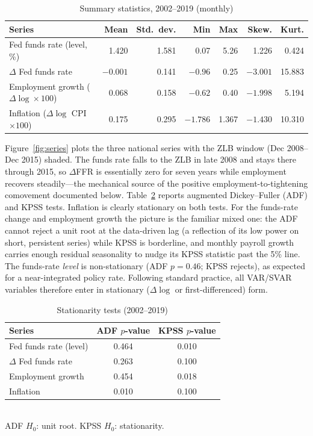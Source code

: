 \documentclass[11pt]{article}
\begin{document}
\begin{table}[H]\centering
\caption{Summary statistics, 2002--2019 (monthly)}\label{tab:summary}
\small
\begin{tabular}{lrrrrrr}
\toprule
Series & Mean & Std.\ dev. & Min & Max & Skew. & Kurt. \\
\midrule
Fed funds rate (level, \%) & 1.420 & 1.581 & 0.07 & 5.26 & 1.226 & 0.424 \\
$\Delta$ Fed funds rate & $-0.001$ & 0.141 & $-0.96$ & 0.25 & $-3.001$ & 15.883 \\
Employment growth ($\Delta\log\times100$) & 0.068 & 0.158 & $-0.62$ & 0.40 & $-1.998$ & 5.194 \\
Inflation ($\Delta\log$ CPI$\times100$) & 0.175 & 0.295 & $-1.786$ & 1.367 & $-1.430$ & 10.310 \\
\bottomrule
\end{tabular}
\end{table}

Figure~\ref{fig:series} plots the three
national series with the ZLB window (Dec 2008--Dec 2015) shaded. The funds rate falls to the
ZLB in late 2008 and stays there through 2015, so $\Delta$FFR is essentially zero for seven
years while employment recovers steadily---the mechanical source of the positive
employment-to-tightening comovement documented below. Table~\ref{tab:adfkpss} reports augmented
Dickey--Fuller (ADF) and KPSS tests. Inflation is clearly stationary on both tests. For the
funds-rate change and employment growth the picture is the familiar mixed one: the ADF cannot
reject a unit root at the data-driven lag (a reflection of its low power on short, persistent
series) while KPSS is borderline, and monthly payroll growth carries enough residual seasonality
to nudge its KPSS statistic past the 5\% line. The funds-rate \emph{level} is non-stationary
(ADF $p=0.46$; KPSS rejects), as expected for a near-integrated policy rate. Following standard
practice, all VAR/SVAR variables therefore enter in stationary ($\Delta\log$ or first-differenced)
form.

\begin{table}[H]\centering
\caption{Stationarity tests (2002--2019)}\label{tab:adfkpss}
\small
\begin{tabular}{lcc}
\toprule
Series & ADF $p$-value & KPSS $p$-value \\
\midrule
Fed funds rate (level) & 0.464 & 0.010 \\
$\Delta$ Fed funds rate & 0.263 & 0.100 \\
Employment growth & 0.454 & 0.018 \\
Inflation & 0.010 & 0.100 \\
\bottomrule
\end{tabular}
\\[2pt]
\footnotesize ADF $H_0$: unit root. KPSS $H_0$: stationarity.
\end{table}
\end{document}
